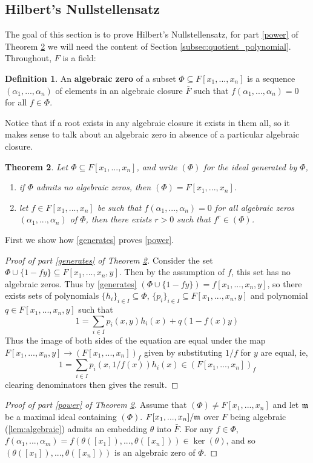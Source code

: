 \documentclass[12pt]{article}
\theoremstyle{plain}
\newtheorem{thm}{Theorem}[subsection] %
\theoremstyle{definition}
\newtheorem{defn}[thm]{Definition} %
\begin{document}
	\subsection{Hilbert's Nullstellensatz}
	The goal of this section is to prove Hilbert's Nullstellensatz, for part \ref{power} of Theorem \ref{thm:hilbertsnullstellensatz} we will need the content of Section \ref{subsec:quotient_polynomial}. Throughout, $F$ is a field:
	\begin{defn}
		\label{def:algzero}
		An \textbf{algebraic zero} of a subset $\Phi \subseteq F[x_1,...,x_n]$ is a sequence $(\alpha_1,...,\alpha_n)$ of elements in an algebraic closure $\bar{F}$ such that $f(\alpha_1,...,\alpha_n) = 0$ for all $f \in \Phi$.
	\end{defn}
	Notice that if a root exists in any algebraic closure it exists in them all, so it makes sense to talk about an algebraic zero in absence of a particular algebraic closure.
	\begin{thm}
		\label{thm:hilbertsnullstellensatz}
		Let $\Phi \subseteq F[x_1,...,x_n]$, and write $(\Phi)$ for the ideal generated by $\Phi$,
		\begin{enumerate}
			\item\label{generates} if $\Phi$ admits no algebraic zeros, then $(\Phi) = F[x_1,...,x_n]$.
			\item\label{power} let $f \in F[x_1,...,x_n]$ be such that $f(\alpha_1,...,\alpha_n) = 0$ for all algebraic zeros $(\alpha_1,...,\alpha_n)$ of $\Phi$, then there exists $r > 0$ such that $f^r \in (\Phi)$.
		\end{enumerate}
	\end{thm}
	First we show how \ref{generates} proves \ref{power}.
	\begin{proof}[Proof of part \ref{generates} of Theorem \ref{thm:hilbertsnullstellensatz}]
		Consider the set $\Phi \cup \lbrace 1 - fy\rbrace \subseteq F[x_1,...,x_n,y]$. Then by the assumption of $f$, this set has no algebraic zeros. Thus by \ref{generates} $(\Phi \cup \lbrace 1 - fy\rbrace) = f[x_1,...,x_n,y]$, so there exists sets of polynomials $\lbrace h_i\rbrace_{i \in I} \subseteq \Phi$, $\lbrace p_i\rbrace_{i \in I} \subseteq F[x_1,...,x_n,y]$ and polynomial $q \in F[x_1,...,x_n,y]$ such that
		\[1 = \sum_{i \in I}p_i(x,y)h_i(x) + q(1 - f(x)y)\]
		Thus the image of both sides of the equation are equal under the map $F[x_1,...,x_n,y] \to (F[x_1,...,x_n])_f$ given by substituting $1/f$ for $y$ are equal, ie,
		\[1 = \sum_{i \in I}p_i(x,1/f(x))h_i(x) \in (F[x_1,...,x_n])_f\]
		clearing denominators then gives the result.
	\end{proof}
	\begin{proof}[Proof of part \ref{power} of Theorem \ref{thm:hilbertsnullstellensatz}]
		Assume that $(\Phi) \neq F[x_1,...,x_n]$ and let $\frak{m}$ be a maximal ideal containing $(\Phi)$. $F[x_1,...,x_n]/\frak{m}$ over $F$ being algebraic (\ref{lem:algebraic}) admits an embedding $\theta$ into $\bar{F}$. For any $f \in \Phi$, $f(\alpha_1,...,\alpha_m) = f(\theta([x_1]),...,\theta([x_n])) \in \operatorname{ker}(\theta)$, and so $(\theta([x_1]),...,\theta([x_n]))$ is an algebraic zero of $\Phi$.
	\end{proof}
\end{document}

